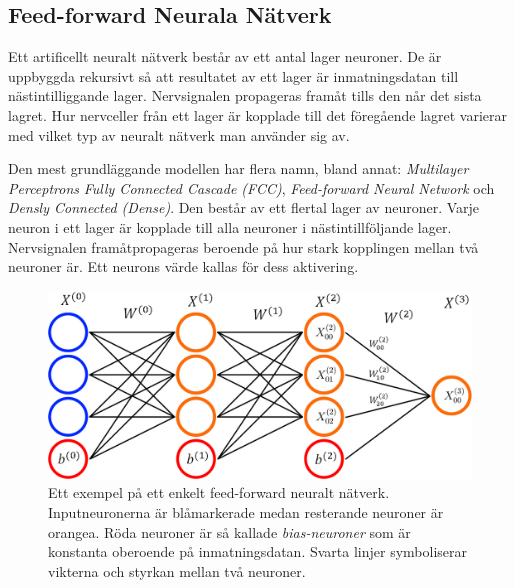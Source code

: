 \documentclass[a4paper,11pt,twoside]{article}
\begin{document}

\subsection{Feed-forward Neurala Nätverk}
Ett artificellt neuralt nätverk består av ett antal lager neuroner. De är uppbyggda rekursivt så att resultatet av ett lager är inmatningsdatan till nästintilliggande lager. Nervsignalen propageras framåt tills den når det sista lagret. Hur nervceller från ett lager är kopplade till det föregående lagret varierar med vilket typ av neuralt nätverk man använder sig av. \cite{cs231n}

Den mest grundläggande modellen har flera namn, bland annat:  \textit{Multilayer Perceptrons} \textit{Fully Connected Cascade (FCC)}, \textit{Feed-forward Neural Network} och \textit{Densly Connected (Dense)}. Den består av ett flertal lager av neuroner. Varje neuron i ett lager är kopplade till alla neuroner i nästintillföljande lager. Nervsignalen framåtpropageras beroende på hur stark kopplingen mellan två neuroner är. Ett neurons värde kallas för dess aktivering. \cite{cs231n}


\begin{figure}[h]\label{figFCC}
	\centering
  		\includegraphics[scale=0.4]{FCC.png}
  	\caption{Ett exempel på ett enkelt feed-forward neuralt nätverk. Inputneuronerna är blåmarkerade medan resterande neuroner är orangea. Röda neuroner är så kallade \textit{bias-neuroner} som är konstanta oberoende på inmatningsdatan. Svarta linjer symboliserar vikterna och styrkan mellan två neuroner.}
\end{figure}
\end{document}
